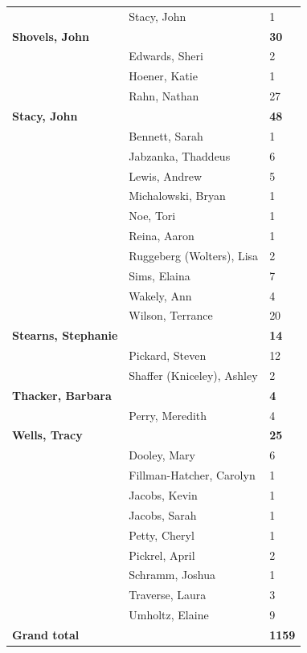 \documentclass{article}\usepackage[]{graphicx}\usepackage[]{color}
\begin{document}
{\begin{longtable} { >{\raggedright}p{}|p{}p{}}
   & Stacy, John & 1 \\ 
  \textbf{Shovels, John} &  & \hspace{2cm}\textbf{30} \\ 
   & Edwards, Sheri & 2 \\ 
   \rowcolor[gray]{0.90} & Hoener, Katie & 1 \\ 
   \rowcolor[gray]{0.90} & Rahn, Nathan & 27 \\ 
   \rowcolor[gray]{0.90}\textbf{Stacy, John} &  & \hspace{2cm}\textbf{48} \\ 
   & Bennett, Sarah & 1 \\ 
   & Jabzanka, Thaddeus & 6 \\ 
   & Lewis, Andrew & 5 \\ 
   \rowcolor[gray]{0.90} & Michalowski, Bryan & 1 \\ 
   \rowcolor[gray]{0.90} & Noe, Tori & 1 \\ 
   \rowcolor[gray]{0.90} & Reina, Aaron & 1 \\ 
   & Ruggeberg (Wolters), Lisa & 2 \\ 
   & Sims, Elaina & 7 \\ 
   & Wakely, Ann & 4 \\ 
   \rowcolor[gray]{0.90} & Wilson, Terrance & 20 \\ 
   \rowcolor[gray]{0.90}\textbf{Stearns, Stephanie} &  & \hspace{2cm}\textbf{14} \\ 
   \rowcolor[gray]{0.90} & Pickard, Steven & 12 \\ 
   & Shaffer (Kniceley), Ashley & 2 \\ 
  \textbf{Thacker, Barbara} &  & \hspace{2cm}\textbf{4} \\ 
   & Perry, Meredith & 4 \\ 
   \rowcolor[gray]{0.90}\textbf{Wells, Tracy} &  & \hspace{2cm}\textbf{25} \\ 
   \rowcolor[gray]{0.90} & Dooley, Mary & 6 \\ 
   \rowcolor[gray]{0.90} & Fillman-Hatcher, Carolyn & 1 \\ 
   & Jacobs, Kevin & 1 \\ 
   & Jacobs, Sarah & 1 \\ 
   & Petty, Cheryl & 1 \\ 
   \rowcolor[gray]{0.90} & Pickrel, April & 2 \\ 
   \rowcolor[gray]{0.90} & Schramm, Joshua & 1 \\ 
   \rowcolor[gray]{0.90} & Traverse, Laura & 3 \\ 
   & Umholtz, Elaine & 9 \\ 
  \textbf{Grand total} &  & \textbf{1159} \\ 
   \end{longtable}

}
\end{document}
